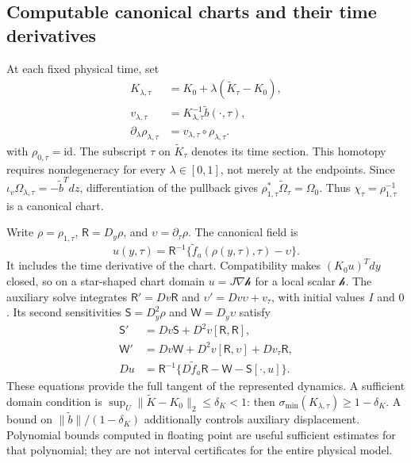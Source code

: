 \subsection{Computable canonical charts and their time derivatives}
At each fixed physical time, set
\begin{equation}
 \begin{aligned}
 K_{\lambda,\tau}&=K_0+\lambda(\widetilde K_\tau-K_0),\\
 v_{\lambda,\tau}&=K_{\lambda,\tau}^{-1}\widetilde b(\cdot,\tau),\\
 \partial_\lambda\rho_{\lambda,\tau}
     &=v_{\lambda,\tau}\circ\rho_{\lambda,\tau}.
\end{aligned}
 \label{eq:th-moser}
\end{equation}
with $\rho_{0,\tau}=\mathrm{id}$. The subscript $\tau$ on $\widetilde K_\tau$ denotes its time section. This homotopy requires nondegeneracy for every $\lambda\in[0,1]$, not merely at the endpoints. Since $\iota_v\Omega_{\lambda,\tau}=-\widetilde b^Tdz$, differentiation of the pullback gives $\rho_{1,\tau}^*\widetilde\Omega_\tau=\Omega_0$. Thus $\chi_\tau=\rho_{1,\tau}^{-1}$ is a canonical chart.

Write $\rho=\rho_{1,\tau}$, $\mathsf R=D_y\rho$, and $\upsilon=\partial_\tau\rho$. The canonical field is
\begin{equation}
 u(y,\tau)=\mathsf R^{-1}\{\widetilde f_a(\rho(y,\tau),\tau)-\upsilon\}.
 \label{eq:th-chart-field}
\end{equation}
It includes the time derivative of the chart. Compatibility makes $(K_0u)^Tdy$ closed, so on a star-shaped chart domain $u=J\nabla\mathcal h$ for a local scalar $\mathcal h$. The auxiliary solve integrates $\mathsf R'=Dv\mathsf R$ and $\upsilon'=Dv\upsilon+v_\tau$, with initial values $I$ and $0$. Its second sensitivities $\mathsf S=D_y^2\rho$ and $\mathsf W=D_y\upsilon$ satisfy
\begin{equation}
 \begin{aligned}
 \mathsf S'&=Dv\mathsf S+D^2v[\mathsf R,\mathsf R],\\
 \mathsf W'&=Dv\mathsf W+D^2v[\mathsf R,\upsilon]+Dv_\tau\mathsf R,\\
 Du&=\mathsf R^{-1}\{D\widetilde f_a\mathsf R-\mathsf W-\mathsf S[\cdot,u]\}.
 \end{aligned}
 \label{eq:th-chart-sensitivities}
\end{equation}
These equations provide the full tangent of the represented dynamics. A sufficient domain condition is $\sup_U\|\widetilde K-K_0\|_2\le\delta_K<1$: then $\sigma_{\min}(K_{\lambda,\tau})\ge1-\delta_K$. A bound on $\|\widetilde b\|/(1-\delta_K)$ additionally controls auxiliary displacement. Polynomial bounds computed in floating point are useful sufficient estimates for that polynomial; they are not interval certificates for the entire physical model.

